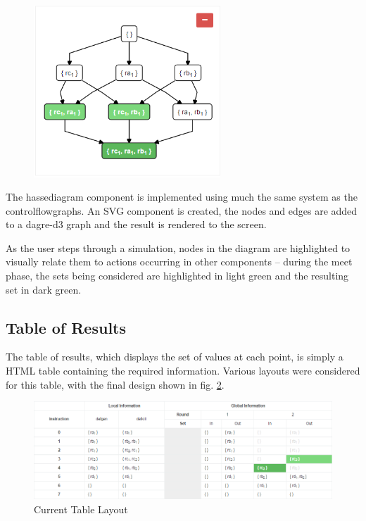 \documentclass[bsc,twoside,singlespacing,parskip,logo,notimes,normalheadings]{infthesis}
\begin{document}
        \begin{figure}
          \centering
          \includegraphics[width=7cm, trim=0 0 0 60]{img/lattice.png}
          \captionsetup{width=6cm, justification=centering}
          \label{fig:lattice}
        \end{figure}

        The \gls{hassediagram} component is implemented using much the
        same system as the \gls{controlflowgraph}s. An SVG component
        is created, the nodes and edges are added to a dagre-d3 graph
        and the result is rendered to the screen.

        As the user steps through a simulation, nodes in the diagram
        are highlighted to visually relate them to actions occurring
        in other components -- during the meet phase, the sets being
        considered are highlighted in light green and the resulting
        set in dark green.

        \subsection{Table of Results}
        The table of results, which displays the set of values at each
        point, is simply a HTML table containing the required
        information. Various layouts were considered for this table,
        with the final design shown in fig. \ref{fig:tableofresults}.

        \begin{figure}[!ht]
          \centering
          \includegraphics[width=\textwidth]{img/tableofresults.png}
          \caption{Current Table Layout}\label{fig:tableofresults}
        \end{figure}
\end{document}
